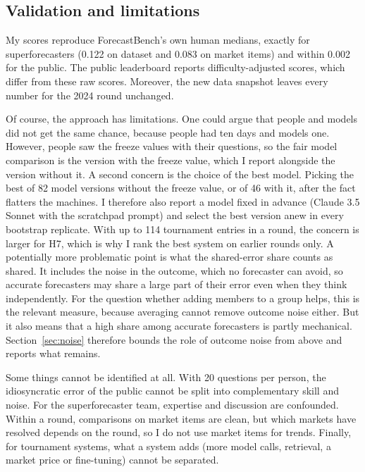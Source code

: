 \documentclass[11pt,a4paper]{article}
\theoremstyle{definition}
\begin{document}
\subsection{Validation and limitations}

My scores reproduce ForecastBench's own human medians, exactly for superforecasters (0.122 on dataset and 0.083 on market items) and within 0.002 for the public. The public leaderboard reports difficulty-adjusted scores, which differ from these raw scores. Moreover, the new data snapshot leaves every number for the 2024 round unchanged.

Of course, the approach has limitations. One could argue that people and models did not get the same chance, because people had ten days and models one. However, people saw the freeze values with their questions, so the fair model comparison is the version with the freeze value, which I report alongside the version without it. A second concern is the choice of the best model. Picking the best of 82 model versions without the freeze value, or of 46 with it, after the fact flatters the machines. I therefore also report a model fixed in advance (Claude 3.5 Sonnet with the scratchpad prompt) and select the best version anew in every bootstrap replicate. With up to 114 tournament entries in a round, the concern is larger for H7, which is why I rank the best system on earlier rounds only. A potentially more problematic point is what the shared-error share counts as shared. It includes the noise in the outcome, which no forecaster can avoid, so accurate forecasters may share a large part of their error even when they think independently. For the question whether adding members to a group helps, this is the relevant measure, because averaging cannot remove outcome noise either. But it also means that a high share among accurate forecasters is partly mechanical. Section~\ref{sec:noise} therefore bounds the role of outcome noise from above and reports what remains.

Some things cannot be identified at all. With 20 questions per person, the idiosyncratic error of the public cannot be split into complementary skill and noise. For the superforecaster team, expertise and discussion are confounded. Within a round, comparisons on market items are clean, but which markets have resolved depends on the round, so I do not use market items for trends. Finally, for tournament systems, what a system adds (more model calls, retrieval, a market price or fine-tuning) cannot be separated.

\end{document}
